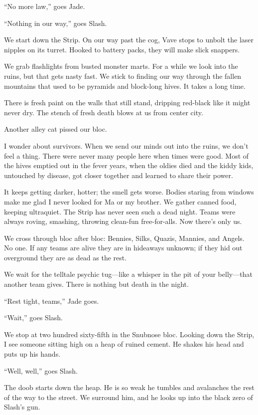 “No more law,” goes Jade.

“Nothing in our way,” goes Slash.

We start down the Strip. On our way past the cog, Vave stops to unbolt the laser nipples on its turret. Hooked to battery packs, they will make slick snappers.

We grab flashlights from busted monster marts. For a while we look into the ruins, but that gets nasty fast. We stick to finding our way through the fallen mountains that used to be pyramids and block-long hives. It takes a long time.

There is fresh paint on the walls that still stand, dripping red-black like it might never dry. The stench of fresh death blows at us from center city.

Another alley cat pissed our bloc.

I wonder about survivors. When we send our minds out into the ruins, we don't feel a thing. There were never many people here when times were good. Most of the hives emptied out in the fever years, when the oldies died and the kiddy kids, untouched by disease, got closer together and learned to share their power.

It keeps getting darker, hotter; the smell gets worse. Bodies staring from windows make me glad I never looked for Ma or my brother. We gather canned food, keeping ultraquiet. The Strip has never seen such a dead night. Teams were always roving, smashing, throwing clean-fun free-for-alls. Now there's only us.

We cross through bloc after bloc: Bennies, Silks, Quazis, Mannies, and Angels. No one. If any teams are alive they are in hideaways unknown; if they hid out overground they are as dead as the rest.

We wait for the telltale psychic tug—like a whisper in the pit of your belly—that another team gives. There is nothing but death in the night.

“Rest tight, teams,” Jade goes.

“Wait,” goes Slash.

We stop at two hundred sixty-fifth in the Snubnose bloc. Looking down the Strip, I see someone sitting high on a heap of ruined cement. He shakes his head and puts up his hands.

“Well, well,” goes Slash.

The doob starts down the heap. He is so weak he tumbles and avalanches the rest of the way to the street. We surround him, and he looks up into the black zero of Slash's gun.

